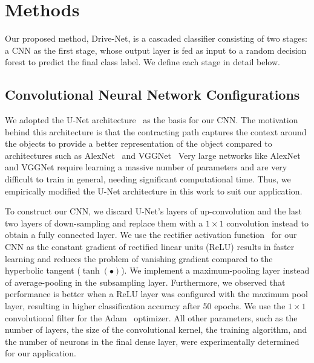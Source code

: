 \documentclass[conference,compsoc]{IEEEtran}
\begin{document}
\section{Methods}
Our proposed method, Drive-Net, is a cascaded classifier consisting of two stages: a CNN as the first stage, whose output layer is fed as input to a random decision forest to predict the final class label. We define each stage in detail below.


\subsection{Convolutional Neural Network Configurations}
We adopted the U-Net architecture~\cite{ronneberger_UNet_2015} as the basis for our CNN\@. The motivation behind this architecture is that the contracting path captures the context around the objects to provide a better representation of the object compared to architectures such as AlexNet~\cite{krizhevsky_One_2014} and VGGNet~\cite{simonyan_Very_2014} Very large networks like AlexNet and VGGNet require learning a massive number of parameters and are very difficult to train in general, needing significant computational time. Thus, we empirically modified the U-Net architecture in this work to suit our application.

To construct our CNN, we discard U-Net's layers of up-convolution and the last two layers of down-sampling and replace them with a $1\times1 $ convolution instead to obtain a fully connected layer. We use the rectifier activation function~\cite{simonyan_Very_2014} for our CNN as the constant gradient of rectified linear units (ReLU) results in faster learning and reduces the problem of vanishing gradient compared to the hyperbolic tangent (${\tanh{(\bullet)}} $). We implement a maximum-pooling layer instead of average-pooling in the subsampling layer. Furthermore, we observed that performance is better when a ReLU layer was configured with the maximum pool layer, resulting in higher classification accuracy after 50 epochs. We use the $1\times1 $ convolutional filter for the Adam~\cite{kingma_Adam_2014} optimizer. All other parameters, such as the number of layers, the size of the convolutional kernel, the training algorithm, and the number of neurons in the final dense layer, were experimentally determined for our application.
\end{document}
